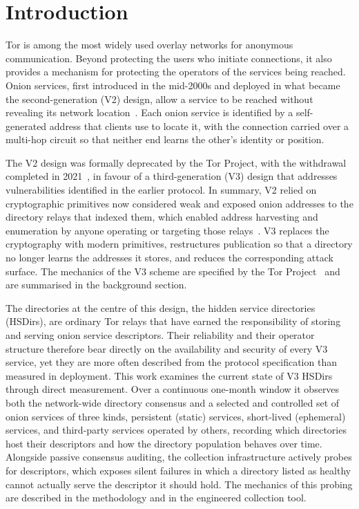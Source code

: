 \documentclass[conference]{IEEEtran}
\begin{document}
\section{Introduction}

Tor is among the most widely used overlay networks for anonymous communication. Beyond protecting the users who initiate connections, it also provides a 
mechanism for protecting the operators of the services being reached. Onion services, first introduced in the mid-2000s and deployed in what became the 
second-generation (V2) design, allow a service to be reached without revealing its network location~\cite{dingledine2004tor}. Each onion service is 
identified by a self-generated address that clients use to locate it, with the connection carried over a multi-hop circuit so that neither end learns the 
other's identity or position.
 
The V2 design was formally deprecated by the Tor Project, with the withdrawal completed in 2021~\cite{tor_v2_deprecation}, in favour of a third-generation (V3) 
design that addresses vulnerabilities identified in the earlier protocol. In summary, V2 relied on cryptographic primitives now considered weak and exposed onion 
addresses to the directory relays that indexed them, which enabled address harvesting and enumeration by anyone operating or targeting those 
relays~\cite{biryukov2013trawling}. V3 replaces the cryptography with modern primitives, restructures publication so that a directory no longer learns the 
addresses it stores, and reduces the corresponding attack surface. The mechanics of the V3 scheme are specified by the Tor Project~\cite{tor_rendspec, tor_dirspec} 
and are summarised in the background section.

The directories at the centre of this design, the hidden service directories (HSDirs), are ordinary Tor relays that have earned the responsibility of storing and 
serving onion service descriptors. Their reliability and their operator structure therefore bear directly on the availability and security of every V3 service, 
yet they are more often described from the protocol specification than measured in deployment. This work examines the current state of V3 HSDirs through direct measurement. Over 
a continuous one-month window it observes both the network-wide directory consensus and a selected and controlled set of onion services of three kinds, persistent (static) 
services, short-lived (ephemeral) services, and third-party services operated by others, recording which directories host their descriptors and how the directory 
population behaves over time. Alongside passive consensus auditing, the collection infrastructure actively probes for descriptors, which exposes silent failures 
in which a directory listed as healthy cannot actually serve the descriptor it should hold. The mechanics of this probing are described in the methodology and in 
the engineered collection tool.
 
\end{document}
